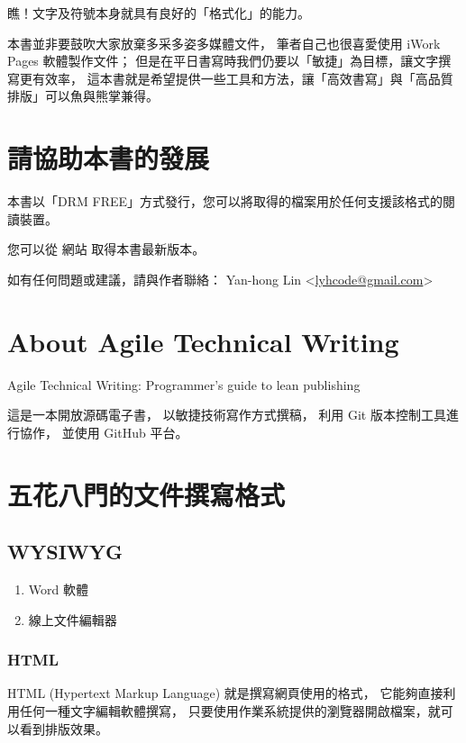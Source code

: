 \documentclass[a4paper,12pt,english]{sphinxmanual}
\begin{document}
瞧！文字及符號本身就具有良好的「格式化」的能力。

本書並非要鼓吹大家放棄多采多姿多媒體文件，
筆者自己也很喜愛使用 iWork Pages 軟體製作文件；
但是在平日書寫時我們仍要以「敏捷」為目標，讓文字撰寫更有效率，
這本書就是希望提供一些工具和方法，讓「高效書寫」與「高品質排版」可以魚與熊掌兼得。


\chapter{請協助本書的發展}
\label{copyright::doc}\label{copyright:id1}
本書以「DRM FREE」方式發行，您可以將取得的檔案用於任何支援該格式的閱讀裝置。

您可以從 網站 取得本書最新版本。

如有任何問題或建議，請與作者聯絡： Yan-hong Lin \textless{}\href{mailto:lyhcode@gmail.com}{lyhcode@gmail.com}\textgreater{}


\chapter{About Agile Technical Writing}
\label{README:about-agile-technical-writing}\label{README::doc}
Agile Technical Writing: Programmer's guide to lean publishing

這是一本開放源碼電子書，
以敏捷技術寫作方式撰稿，
利用 Git 版本控制工具進行協作，
並使用 GitHub 平台。


\chapter{五花八門的文件撰寫格式}
\label{syntax::doc}\label{syntax:id1}

\section{WYSIWYG}
\label{syntax:wysiwyg}\begin{enumerate}
\item {} 
Word 軟體

\item {} 
線上文件編輯器

\end{enumerate}


\subsection{HTML}
\label{syntax:html}
HTML (Hypertext Markup Language) 就是撰寫網頁使用的格式，
它能夠直接利用任何一種文字編輯軟體撰寫，
只要使用作業系統提供的瀏覽器開啟檔案，就可以看到排版效果。
\end{document}
